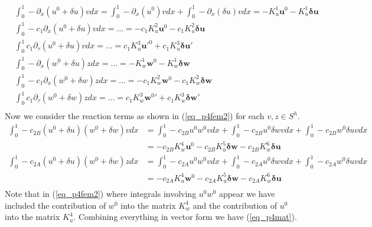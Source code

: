 \documentclass[11pt,fleqn]{article}
\theoremstyle{defstyle}
\begin{document}
\begin{equation}
\begin{aligned}
&\int_0^1 -\partial_{x}(u^0 + \delta u)vdx = \int_0^1 -\partial_{x}(u^0)vdx +\int_0^1 -\partial_{x}(\delta u)vdx  = -K^1_u\mathbf{u}^0 - K^1_u\mathbf{\delta u}  \\
&\int_0^1 -c_1\partial_x(u^0 + \delta u)vdx= \hdots = -c_1K^2_u\mathbf{u}^0 - c_1K^2_u\mathbf{\delta u}\\ 
&\int_0^1 c_1\partial_\tau(u^0 + \delta u)v dx =\hdots = c_1K^3_u\mathbf{u}\prime^0 + c_1K^3_u\mathbf{\delta u}\prime \\
&\int_0^1 -\partial_{x}(w^0 + \delta u)z dx= \hdots =-K^1_w\mathbf{w}^0 - K^1_w\mathbf{\delta w}\\
&\int_0^1 -c_1\partial_x(w^0 + \delta w)zdx= \hdots =-c_1K^2_w\mathbf{w}^0 -c_1 K^2_w\mathbf{\delta w}\\ 
&\int_0^1 c_1\partial_\tau(w^0 + \delta w)z dx = \hdots =c_1K^3_w\mathbf{w}^0\prime + c_1K^3_w\mathbf{\delta w}\prime \\ 
\end{aligned}
\label{eq_p4fem}
\end{equation}
Now we consider the reaction terms as shown in (\ref{eq_p4fem2}) for each $v,z \in S^h$.
\begin{equation}
\begin{aligned}
\int_0^1 - c_{2B}(u^0 + \delta u)(w^0 +\delta w)vdx &=  \int_0^1 - c_{2B}u^0w^0v dx + \int_0^1 - c_{2B}u^0\delta wv dx + \int_0^1 - c_{2B}w^0\delta uv dx\\
&= -c_{2B}K^4_w\mathbf{u}^0 -c_{2B}K^5_u\mathbf{\delta w} -c_{2B}K^6_w\mathbf{\delta u}  \\
\int_0^1 - c_{2A}(u^0 + \delta u)(w^0 +\delta w)zdx &= \int_0^1 - c_{2A}u^0w^0v dx + \int_0^1 - c_{2A}u^0\delta wv dx + \int_0^1 - c_{2A}w^0\delta uv dx \\
&= -c_{2A}K^4_u\mathbf{w}^0 -c_{2A}K^5_u\mathbf{\delta w} -c_{2A}K^6_w\mathbf{\delta u}  \\ 
\end{aligned}
\label{eq_p4fem2}
\end{equation}
Note that in (\ref{eq_p4fem2}) where integrals involving $u^0w^0$ appear we have included the contribution of $w^0$ into the matrix $K^4_w$ and the contribution of $u^0$ into the matrix $K^4_u$. Combining everything in vector form we have (\ref{eq_p4mat}).
\end{document}
